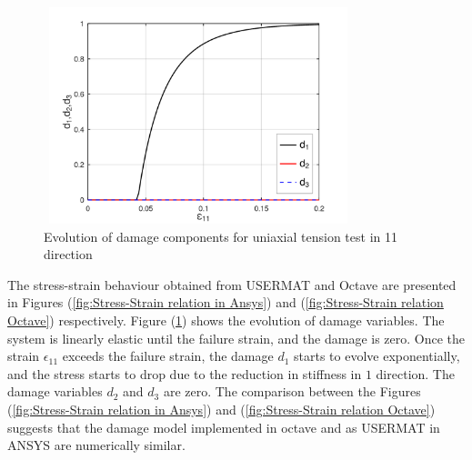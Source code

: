 \documentclass[12pt,a4paper,twoside,openright]{report}
\begin{document}
\FloatBarrier
\begin{figure}[hbt!]
\begin{center}
  \includegraphics[width=9cm,height=6.3cm]{21.d1,d2,d3.png}
   \caption{Evolution of damage components for uniaxial tension test in 11 direction}
   \label{fig:Evolution of damage in 11 direction} 
 \end{center}    
\end{figure}
\FloatBarrier
\indent\indent\indent The stress-strain behaviour obtained from USERMAT and Octave are presented in Figures (\ref{fig:Stress-Strain relation in Ansys}) and (\ref{fig:Stress-Strain relation Octave}) respectively.  Figure (\ref{fig:Evolution of damage in 11 direction}) shows the evolution of damage variables. The system is linearly elastic until the failure strain, and the damage is zero. Once the strain $\epsilon_{11}$ exceeds the failure strain, the damage $d_{1}$ starts to evolve exponentially, and the stress starts to drop due to the reduction in stiffness in $1$ direction.  The damage variables $d_{2}$ and $d_{3}$ are zero. The comparison between the Figures (\ref{fig:Stress-Strain relation in Ansys}) and (\ref{fig:Stress-Strain relation Octave}) suggests that the damage model implemented in octave and as USERMAT in ANSYS are numerically similar.
\end{document}
